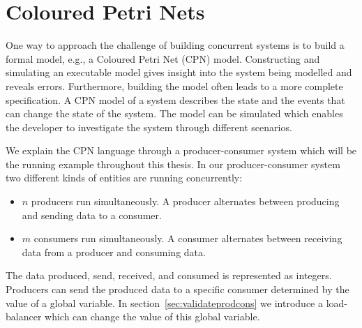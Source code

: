 \section{Coloured Petri Nets}
\label{sec:cpn}
One way to approach the challenge of building concurrent systems is to build a formal model, e.g., a Coloured Petri Net (CPN) \cite{RefWorks:3} model. Constructing and simulating an executable model gives insight into the system being modelled and reveals errors. Furthermore, building the model often leads to a more complete specification. A CPN model of a system describes the state and the events that can change the state of the system. The model can be simulated which enables the developer to investigate the system through different scenarios.

We explain the CPN language through a producer-consumer system which will be the running example throughout this thesis. In our producer-consumer system two different kinds of entities are running concurrently:	

\begin{itemize}
  \item $n$ producers run simultaneously. A producer alternates between producing and sending data to a consumer. 
  \item $m$ consumers run simultaneously. A consumer alternates between receiving data from a producer and consuming data.  
\end{itemize} 

The data produced, send, received, and consumed is represented as integers. Producers can send the produced data to a specific consumer determined by the value of a global variable. In section~\ref{sec:validateprodcons} we introduce a load-balancer which can change the value of this global variable.

